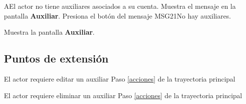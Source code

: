 \begin{UCtrayectoriaA}{A}{El actor no tiene auxiliares asociados a su cuenta.}
	\UCpaso Muestra el mensaje  en la pantalla \textbf{Auxiliar}.
	\UCpaso [\UCactor] Presiona el botón  del mensaje {MSG21}{No hay auxiliares}.
	
	\UCpaso Muestra la pantalla \textbf{Auxiliar}.
	
\end{UCtrayectoriaA}


\subsection{Puntos de extensión}

\UCExtensionPoint
{El actor requiere editar un auxiliar}
{ Paso \ref{acciones} de la trayectoria principal}
{}

\UCExtensionPoint
{El actor requiere eliminar un auxiliar}
{ Paso \ref{acciones} de la trayectoria principal}
{}


